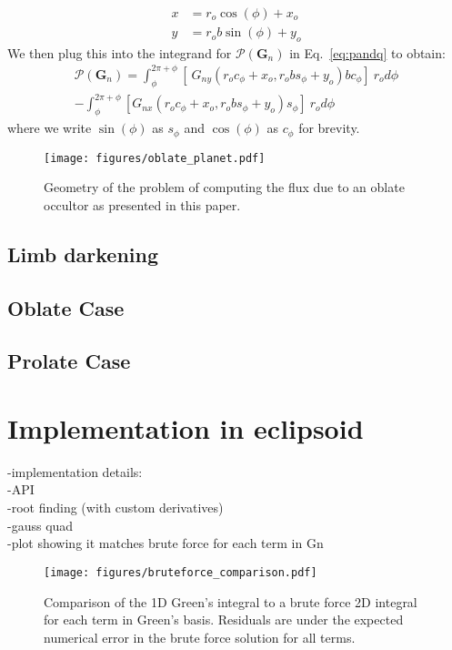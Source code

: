 \documentclass[twocolumn]{aastex631}
\begin{document}
\begin{align}
    x &= r_o \cos(\phi) + x_o \\
    y &= r_o b \sin(\phi) + y_o
\end{align}
We then plug this into the integrand for $\mathcal{P}(\mathbf{G}_n)$ in Eq.~\ref{eq:pandq} to obtain:
\begin{align}
\mathcal{P}(\mathbf{G}_n) = \int_{\phi}^{2\pi + \phi}[\ G_{ny}(r_o c_\phi + x_o , r_o b s_\phi + y_o) b c_\phi] \ r_o d\phi \\
- \int_{\phi}^{2\pi + \phi}[G_{nx}(r_o c_\phi + x_o, r_o b s_\phi + y_o)s_\phi]\ r_o d\phi
\end{align}
where we write $\sin{(\phi)}$ as $s_\phi$ and $\cos{(\phi)}$ as $c_\phi$ for brevity.
\begin{figure}[ht!]
    \begin{centering}
        \texttt{[image: figures/oblate\_planet.pdf]}
        \caption{Geometry of the problem of computing the flux due to an oblate occultor as presented in this paper. 
        }
        \label{fig:integral_bounds}
    \end{centering}
\end{figure}

\subsection{Limb darkening}
\subsection{Oblate Case}
\subsection{Prolate Case}
\section{Implementation in eclipsoid} \label{sec:eclipsoid}
-implementation details:\\
    -API\\
    -root finding (with custom derivatives)\\
    -gauss quad\\
    -plot showing it matches brute force for each term in Gn   \\
\begin{figure}[ht!]
    \begin{centering}
        \texttt{[image: figures/bruteforce\_comparison.pdf]}
        \caption{Comparison of the 1D Green's integral to a brute force 2D integral for each term in Green's basis. Residuals are under the expected numerical error in the brute force solution for all terms.
        }
        \label{fig:bruteforce_comparison}
    \end{centering}
\end{figure}
\end{document}
